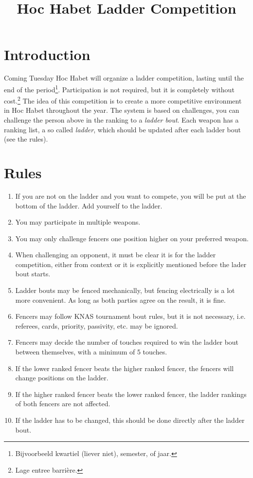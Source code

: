 \documentclass{article}
\title{Hoc Habet Ladder Competition}
\author{}
\date{}
\begin{document}
\maketitle
\section{Introduction}
Coming Tuesday Hoc Habet will organize a ladder competition, lasting until the end of the period\footnote{Bijvoorbeeld kwartiel (liever niet), semester, of jaar.}. Participation is not required, but it is completely without cost.\footnote{Lage entree barrière.} The idea of this competition is to create a more competitive environment in Hoc Habet throughout the year. The system is based on challenges, you can challenge the person above in the ranking to a \emph{ladder bout}. Each weapon has a ranking list, a so called \emph{ladder}, which should be updated after each ladder bout (see the rules). 

\section{Rules}
\begin{enumerate} 
    \item If you are not on the ladder and you want to compete, you will be put at the bottom of the ladder. Add yourself to the ladder.
    \item You may participate in multiple weapons.
    \item You may only challenge fencers one position higher on your preferred weapon. 
    \item When challenging an opponent, it must be clear it is for the ladder competition, either from context or it is explicitly mentioned before the lader bout starts.
    \item Ladder bouts may be fenced mechanically, but fencing electrically is a lot more convenient. As long as both parties agree on the result, it is fine.
    \item Fencers may follow KNAS tournament bout rules, but it is not necessary, i.e. referees, cards, priority, passivity, etc. may be ignored.
    \item Fencers may decide the number of touches required to win the ladder bout between themselves, with a minimum of 5 touches.
    \item If the lower ranked fencer beats the higher ranked fencer, the fencers will change positions on the ladder.
    \item If the higher ranked fencer beats the lower ranked fencer, the ladder rankings of both fencers are not affected.
    \item If the ladder has to be changed, this should be done directly after the ladder bout.
\end{enumerate}
\newpage
\end{document}
